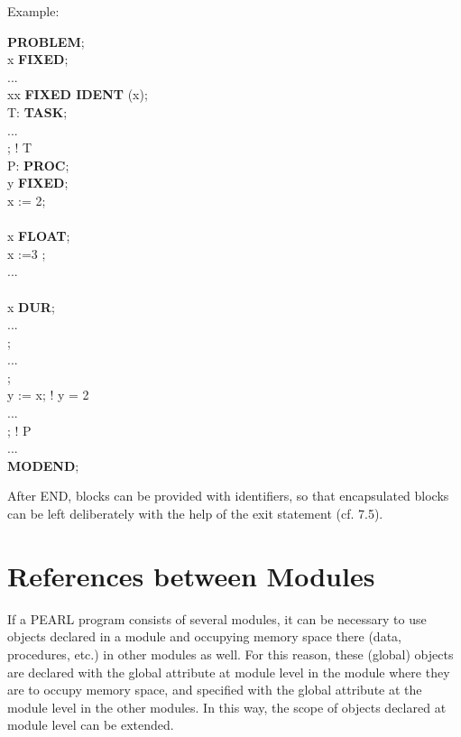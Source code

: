 Example:


{\bf PROBLEM};\\
 x {\bf FIXED};\\
\x ...\\
 xx {\bf FIXED IDENT} (x);\\
\x T: {\bf TASK};\\
\x \x ...\\
\x {}; ! T\\
\x P: {\bf PROC};\\
\x {} y {\bf FIXED};\\
\x \x x := 2;\\
\x {}\\
\x \x {} x {\bf FLOAT};\\
\x \x \x x :=3 ;\\
\x \x \x ...\\
\x \x {}\\
\x \x \x {} x {\bf DUR};\\
\x \x \x \x ...\\
\x \x {};\\
\x \x \x ...\\
\x {};\\
\x \x y := x; ! y = 2\\
\x \x ...\\
\x {}; ! P\\
\x ...\\
{\bf MODEND};

After END, blocks can be provided with identifiers, so that encapsulated
blocks can be left deliberately with the help of the exit statement
(cf. 7.5).

\section{References between Modules}  %
\label{sec_references}

If a PEARL program consists of several modules, it can be necessary to
use objects declared in a module and occupying memory space there (data,
procedures, etc.) in other modules as well. For this reason, these
(global) objects are declared with the global attribute at module level
in the module where they are to occupy memory space, and specified with
the global attribute at the module level in the other modules. In this
way, the scope of objects declared at module level can be extended.

